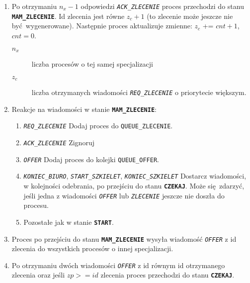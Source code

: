 \documentclass[12pt]{article}
\newcommand{\state}[1]{\texttt{\textbf{#1}}}
\newcommand{\msg}[1]{\texttt{\emph{#1}}}
\newcommand{\var}[1]{\texttt{#1}}
\begin{document}
\begin{enumerate}
	\item Po otrzymaniu $n_x - 1$ odpowiedzi \msg{ACK\_ZLECENIE} proces przechodzi do stanu \state{MAM\_ZLECENIE}. Id zlecenia jest równe $z_c + 1$ (to zlecenie może jeszcze nie być wygenerowane). Następnie proces aktualizuje zmienne: $z_c$ += $cnt + 1$, $cnt = 0$.
	\begin{description}
		\item[$n_x$] liczba procesów o tej samej specjalizacji
		\item[$z_c$] liczba otrzymanych wiadomości \msg{REQ\_ZLECENIE} o priorytecie większym.
	\end{description}
			
	\item Reakcje na wiadomości w stanie \state{MAM\_ZLECENIE}:
	\begin{enumerate}
		\item \msg{REQ\_ZLECENIE} Dodaj proces do \var{QUEUE\_ZLECENIE}.
		\item \msg{ACK\_ZLECENIE} Zignoruj
		\item \msg{OFFER} Dodaj proces do kolejki \var{QUEUE\_OFFER}.
		\item \msg{KONIEC\_BIURO}, \msg{START\_SZKIELET}, \msg{KONIEC\_SZKIELET} Dostarcz wiadomości, w kolejności odebrania, po przejściu do stanu \state{CZEKAJ}. Może się zdarzyć, jeśli jedna z wiadomości \msg{OFFER} lub \msg{ZLECENIE} jeszcze nie doszła do procesu.
		\item  Pozostałe jak w stanie \state{START}.
	\end{enumerate}
	
	\item Proces po przejściu do stanu \state{MAM\_ZLECENIE} wysyła wiadomość \msg{OFFER} z id zlecenia do wszystkich procesów o innej specjalizacji.
	
	\item Po otrzymaniu dwóch wiadomości \msg{OFFER} z id równym id otrzymanego zlecenia oraz jeśli $zp >= id$ zlecenia proces przechodzi do stanu \state{CZEKAJ}.
\end{enumerate}
\end{document}
